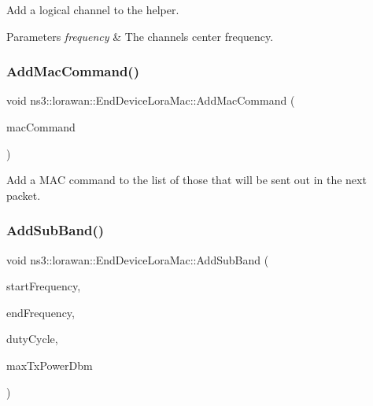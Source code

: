 Add a logical channel to the helper.


\begin{DoxyParams}{Parameters}
{\em frequency} & The channel\textquotesingle{}s center frequency. \\
\hline
\end{DoxyParams}
\mbox{\label{classns3_1_1lorawan_1_1EndDeviceLoraMac_a9c830a6ebb06b450727f7c226e0e2c01}} 
\subsubsection{\texorpdfstring{Add\+Mac\+Command()}{AddMacCommand()}}
{\footnotesize\ttfamily void ns3\+::lorawan\+::\+End\+Device\+Lora\+Mac\+::\+Add\+Mac\+Command (\begin{DoxyParamCaption}\item[{Ptr$<$ \hyperlink{classns3_1_1lorawan_1_1MacCommand}{Mac\+Command} $>$}]{mac\+Command }\end{DoxyParamCaption})}

Add a M\+AC command to the list of those that will be sent out in the next packet. \mbox{\label{classns3_1_1lorawan_1_1EndDeviceLoraMac_a0ec4f0dc1b5fe2feb17125f5d3fbb3b9}} 
\subsubsection{\texorpdfstring{Add\+Sub\+Band()}{AddSubBand()}}
{\footnotesize\ttfamily void ns3\+::lorawan\+::\+End\+Device\+Lora\+Mac\+::\+Add\+Sub\+Band (\begin{DoxyParamCaption}\item[{double}]{start\+Frequency,  }\item[{double}]{end\+Frequency,  }\item[{double}]{duty\+Cycle,  }\item[{double}]{max\+Tx\+Power\+Dbm }\end{DoxyParamCaption})}

